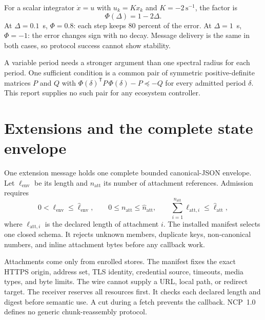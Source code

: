 \documentclass[11pt,a4paper]{article}
\theoremstyle{definition}
\begin{document}
For a scalar integrator $\dot x=u$ with $u_k=Kx_k$ and $K=-2\,\mathrm{s}^{-1}$, the
factor is
\begin{equation}\label{eq:scalar-loop}
\Phi(\Delta)=1-2\Delta.
\end{equation}
At $\Delta=0.1$~s, $\Phi=0.8$: each step keeps 80 percent of the error. At
$\Delta=1$~s, $\Phi=-1$: the error changes sign with no decay. Message delivery is the
same in both cases, so protocol success cannot show stability.

A variable period needs a stronger argument than one spectral radius for each period.
One sufficient condition is a common pair of symmetric positive-definite matrices
$P$ and $Q$ with $\Phi(\delta)^{\mathsf T}P\,\Phi(\delta)-P\preceq-Q$ for every admitted
period $\delta$. This report supplies no such pair for any ecosystem controller.

\section{Extensions and the complete state envelope}


One extension message holds one complete bounded canonical-JSON envelope. Let
$\ell_{\mathrm{env}}$ be its length and $n_{\mathrm{att}}$ its number of attachment
references. Admission requires
\begin{equation}\label{eq:envelope}
0<\ell_{\mathrm{env}}\leq\hat\ell_{\mathrm{env}},\qquad
0\leq n_{\mathrm{att}}\leq\hat n_{\mathrm{att}},\qquad
\sum_{i=1}^{n_{\mathrm{att}}}\ell_{\mathrm{att},i}\leq\hat\ell_{\mathrm{att}},
\end{equation}
where $\ell_{\mathrm{att},i}$ is the declared length of attachment $i$. The installed
manifest selects one closed schema. It rejects unknown members, duplicate keys,
non-canonical numbers, and inline attachment bytes before any callback work.

Attachments come only from enrolled stores. The manifest fixes the exact HTTPS origin,
address set, TLS identity, credential source, timeouts, media types, and byte limits.
The wire cannot supply a URL, local path, or redirect target. The receiver reserves all
resources first. It checks each declared length and digest before semantic use. A cut
during a fetch prevents the callback. NCP~1.0 defines no generic chunk-reassembly
protocol.
\end{document}
